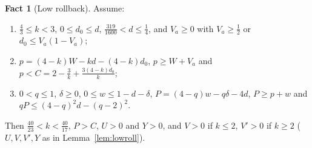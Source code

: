 \documentclass[11pt,a4paper]{article}
\numberwithin{equation}{section}
\theoremstyle{definition}
\newtheorem{fact}{Fact}
\begin{document}
\begin{fact}[Low rollback]\label{fact:low}Assume:
\begin{enumerate}[label=(\roman*)]
\item $\frac43\le k<3$, $0\le d_0\le d$, $\frac{319}{1600}<d\le\frac14$, and
$V_a\ge0$ with $V_a\ge\frac12$ or $d_0\le V_a(1-V_a)$;
\item $p=(4-k)W-kd-(4-k)d_0$, $p\ge W+V_a$ and $p<C=2-\frac3k+\frac{3(4-k)d_0}k$;
\item $0<q\le1$, $\delta\ge0$, $0\le w\le1-d-\delta$,
$P=(4-q)w-q\delta-4d$, $P\ge p+w$ and $qP\le(4-q)^2d-(q-2)^2$.
\end{enumerate}
Then $\frac{40}{23}<k<\frac{40}{17}$, $P>C$, $U>0$ and $Y>0$, and $V>0$ if
$k\le2$, $V'>0$ if $k\ge2$ ($U,V,V',Y$ as in Lemma~\ref{lem:lowroll}).
\end{fact}
\end{document}
